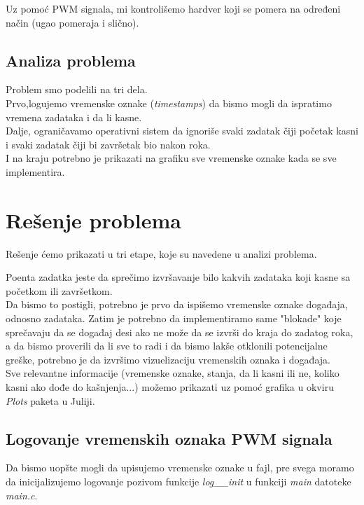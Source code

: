 \documentclass[a4paper, 11pt, titlepage]{article}
\begin{document}
Uz pomoć PWM signala, mi kontrolišemo hardver koji se pomera na određeni način (ugao pomeraja i slično). 

\subsection{Analiza problema}

Problem smo podelili na tri dela. 
\\

Prvo,logujemo vremenske oznake (\textit{timestamps}) da bismo mogli da ispratimo vremena zadataka i da li kasne. 
\\

Dalje, ograničavamo operativni sistem da ignoriše svaki zadatak čiji početak kasni i svaki zadatak čiji bi završetak bio nakon roka. 
\\

I na kraju potrebno je prikazati na grafiku sve vremenske oznake kada se sve implementira. 


\newpage
\section{Rešenje problema}

Rešenje ćemo prikazati u tri etape, koje su navedene u analizi problema.

Poenta zadatka jeste da sprečimo izvršavanje bilo kakvih zadataka koji kasne sa početkom ili završetkom.  \\

Da bismo to postigli, potrebno je prvo da ispišemo vremenske oznake događaja, odnosno zadataka. Zatim je potrebno da implementiramo same "blokade" koje sprečavaju da se događaj desi ako ne može da se izvrši do kraja do zadatog roka, a da bismo proverili da li sve to radi i da bismo lakše otklonili potencijalne greške, potrebno je da izvršimo vizuelizaciju vremenskih oznaka i događaja.  \\

Sve relevantne informacije (vremenske oznake, stanja, da li kasni ili ne, koliko kasni ako dođe do kašnjenja...) možemo prikazati uz pomoć grafika u okviru \textit{Plots} paketa u Juliji. 
\subsection{Logovanje vremenskih oznaka PWM signala}
Da bismo uopšte mogli da upisujemo vremenske oznake u fajl, pre svega moramo da inicijalizujemo logovanje pozivom funkcije \textit{log\_\_init} u funkciji \textit{main} datoteke \textit{main.c}. \\
\end{document}
